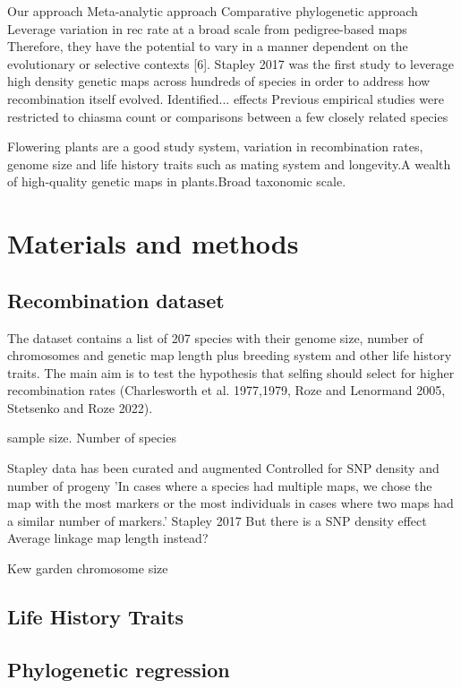 \documentclass{article}
\begin{document}
Our approach
Meta-analytic approach
Comparative phylogenetic approach
Leverage variation in rec rate at a broad scale from pedigree-based maps
Therefore, they have the potential to vary in a manner dependent on the evolutionary or selective contexts [6].
Stapley 2017 was the first study to leverage high density genetic maps across hundreds of species in order to address how recombination itself evolved. Identified... effects
Previous empirical studies were restricted to chiasma count or comparisons between a few closely related species



Flowering plants are a good study system, variation in recombination rates, genome size and life history traits such as mating system and longevity.A wealth of high-quality genetic maps in plants.Broad taxonomic scale.



\section*{Materials and methods}

\subsection*{Recombination dataset}

The dataset contains a list of 207 species with their genome size, number of chromosomes and genetic map length plus breeding system and other life history traits.
The main aim is to test the hypothesis that selfing should select for higher recombination rates (Charlesworth et al. 1977,1979, Roze and Lenormand 2005, Stetsenko and Roze 2022).

sample size. Number of species

Stapley data has been curated and augmented
Controlled for SNP density and number of progeny
'In cases where a species had multiple maps, we chose the map with the most markers or the most individuals in cases where two maps had a similar number of markers.' Stapley 2017
But there is a SNP density effect
Average linkage map length instead?


Kew garden chromosome size




\subsection*{Life History Traits}


\subsection*{Phylogenetic regression}
\end{document}
